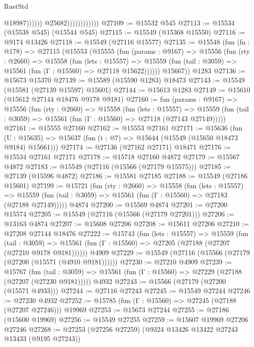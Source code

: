 \begin{lexlean}{RustStd}
\begin{coremodule}
                                        @18987))))))
                            @25682))))))))))))
@27109 := @15532 @545
@27113 := @15534 (@15538 @545) (@15544 @545)
@27115 := @15549 (@15368 @15550)
@27116 := @9174 @13426
@27118 := @15549 (@27116 @15577)
@27135 := @15548
    (fun (fn : @178) =>
    @27115
      (@15553
        (@15555
          (fun (params : @9167) =>
          @15556
            (fun (rty : @2660) =>
            @15558
              (fun (lets : @15557) =>
              @15559 (fun (tail : @3059) => @15561 (fun (Γ : @15560) => @27118 @15622))))))
        @15667))
    @1283
@27136 := @15673 @15370
@27139 := @15589 (@15590 @1283) @18473
@27143 := @15549 (@15581 (@27139 @15597) @15601)
@27144 := @15613 @1283
@27149 := @15610 (@15612 @27144 @18476 @9178 @9181)
@27160 := fun (params : @9167) =>
  @15556
    (fun (rty : @2660) =>
    @15558
      (fun (lets : @15557) =>
      @15559 (fun (tail : @3059) => @15561 (fun (Γ : @15560) => @27118 (@27143 @27149)))))
@27161 := @15555 @27160
@27162 := @15553 @27161
@27171 := @15636
    (fun (U : @15635) => @15637 (fun (t : @7) => @15644 (@15549 (@15650 @18473 @9184) @15661)))
@27174 := @27136 (@27162 @27171) @18471
@27176 := @15534 @27161 @27171
@27178 := @15718 @27160 @4872
@27179 := @15567 @4872
@27183 := @15549 (@27116 (@15566 (@27179 @15575)))
@27185 := @27139 (@15596 @4872)
@27186 := @15581 @27185
@27188 := @15549 (@27186 @15601)
@27199 := @15721
    (fun (rty : @2660) =>
    @15558
      (fun (lets : @15557) =>
      @15559 (fun (tail : @3059) => @15561 (fun (Γ : @15560) => @27183 (@27188 @27149)))))
    @4874
@27200 := @15569 @4874
@27201 := @27200 @15574
@27205 := @15549 (@27116 (@15566 (@27179 @27201)))
@27206 := @13163 @4874
@27207 := @15608 @27206
@27208 := @15611 @27206
@27210 := @27208 @27144 @18476
@27222 := @15743
    (fun (lets : @15557) =>
    @15559
      (fun (tail : @3059) =>
      @15561 (fun (Γ : @15560) => @27205 (@27188 (@27207 (@27210 @9178 @9181))))))
    @4909
@27229 := @15549 (@27116 (@15566 (@27179 (@27200 (@15571 (@4910 @9181))))))
@27230 := @27210 @4909
@27239 := @15767
    (fun (tail : @3059) => @15561 (fun (Γ : @15560) => @27229 (@27188 (@27207 (@27230 @9181)))))
    @4932
@27243 := @15566 (@27179 (@27200 (@15571 @4933)))
@27244 := @27116 @27243
@27245 := @15549 @27244
@27246 := @27230 @4932
@27252 := @15785 (fun (Γ : @15560) => @27245 (@27188 (@27207 @27246))) @19969
@27253 := @15673 @27244
@27255 := @27186 (@15600 @19969)
@27256 := @15549 @27255
@27259 := @15607 @19969 @27206 @27246
@27268 := @27253 (@27256 @27259) (@9324 @13426 @13422 @27243 @13433 (@9195 @27243))

\end{coremodule}
\end{lexlean}
